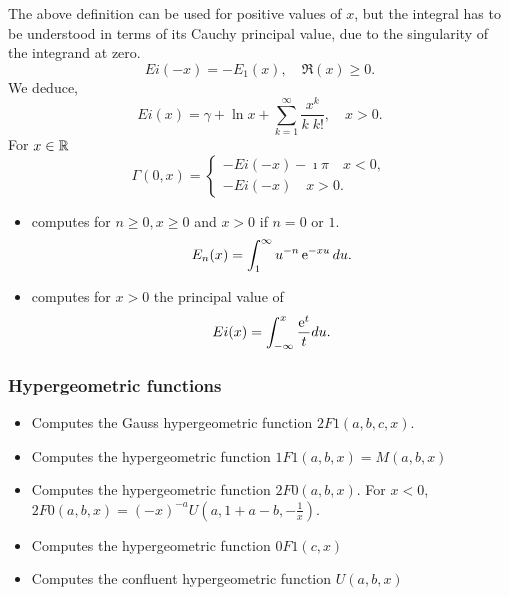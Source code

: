 The above definition  can be used for positive values of $x$, but the integral
has to be understood in terms of its Cauchy principal value, due to the
singularity of the integrand at zero.
\begin{equation*}
  {Ei}(-x) = -{E}_1(x) , \quad \Re(x) \ge 0.
\end{equation*}
We deduce, 
\begin{equation*}
  Ei(x) = \gamma + \ln x+ \sum_{k=1}^{\infty} \frac{x^k}{k\; k!}, \quad x>0.
\end{equation*}
For $x \in {\mathbb R}$ 
\begin{equation*}
  \Gamma(0, x)=\left\{
    \begin{array}{l}
      -Ei(-x)-\imath \pi  \quad  x<0, \\
      -Ei(-x) \quad x>0. 
    \end{array}\right.
\end{equation*}

\begin{itemize}
\item {}
  \sshortdescribe   computes for  $ n\geq 0, x \geq 0$ and $x>0$ if $n=0$ or $1$.
  \begin{equation*}
    E_n(x)= \int_1^{\infty} u^{-n} \operatorname{e}^{ -x u } du.
  \end{equation*}
\item {}
  \sshortdescribe   computes for  $x>0$  the principal value of
  \begin{equation*}
    Ei(x)= \int_{-\infty}^x \frac{\operatorname{e}^{ t }}{t}  du.
  \end{equation*}
\end{itemize}

\subsubsection{Hypergeometric functions}

\begin{itemize}
\item {}
\sshortdescribe Computes the Gauss hypergeometric function $2F1(a,b,c,x)$. 
\item {}
  \sshortdescribe Computes the hypergeometric function $1F1(a,b,x) = M(a,b,x)$
\item {}
  \sshortdescribe Computes the hypergeometric function $2F0(a,b,x)$. For
  $x<0$, $2F0 (a,b,x) = (-x)^{-a} U(a,1+a-b,-\frac{1}{x})$.
\item {}
  \sshortdescribe Computes the hypergeometric function $0F1(c,x)$
\item {}
    \sshortdescribe Computes the confluent hypergeometric function $U(a,b,x)$
\end{itemize}

